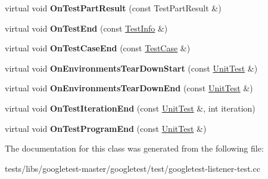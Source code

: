 \begin{DoxyCompactItemize}
virtual void {\bfseries On\+Test\+Part\+Result} (const Test\+Part\+Result \&)
\item 
\mbox{\label{classtesting_1_1internal_1_1EventRecordingListener_adb076f145cc20d9b27441b9c75da4b81}} 
virtual void {\bfseries On\+Test\+End} (const \hyperlink{classtesting_1_1TestInfo}{Test\+Info} \&)
\item 
\mbox{\label{classtesting_1_1internal_1_1EventRecordingListener_a4d0cb8a389c7339bce0aa6128291529f}} 
virtual void {\bfseries On\+Test\+Case\+End} (const \hyperlink{classtesting_1_1TestCase}{Test\+Case} \&)
\item 
\mbox{\label{classtesting_1_1internal_1_1EventRecordingListener_a17eebd7bb5cc6bab53b20794919ca5ae}} 
virtual void {\bfseries On\+Environments\+Tear\+Down\+Start} (const \hyperlink{classtesting_1_1UnitTest}{Unit\+Test} \&)
\item 
\mbox{\label{classtesting_1_1internal_1_1EventRecordingListener_acd5a3dc070265166a7da68222031fd61}} 
virtual void {\bfseries On\+Environments\+Tear\+Down\+End} (const \hyperlink{classtesting_1_1UnitTest}{Unit\+Test} \&)
\item 
\mbox{\label{classtesting_1_1internal_1_1EventRecordingListener_ab0cc007bcfaf06cd383d574c88f62aea}} 
virtual void {\bfseries On\+Test\+Iteration\+End} (const \hyperlink{classtesting_1_1UnitTest}{Unit\+Test} \&, int iteration)
\item 
\mbox{\label{classtesting_1_1internal_1_1EventRecordingListener_a21fe9c3c519c4599a48b16ddfb734aa3}} 
virtual void {\bfseries On\+Test\+Program\+End} (const \hyperlink{classtesting_1_1UnitTest}{Unit\+Test} \&)
\end{DoxyCompactItemize}


The documentation for this class was generated from the following file\+:\begin{DoxyCompactItemize}
\item 
tests/libs/googletest-\/master/googletest/test/googletest-\/listener-\/test.\+cc\end{DoxyCompactItemize}

